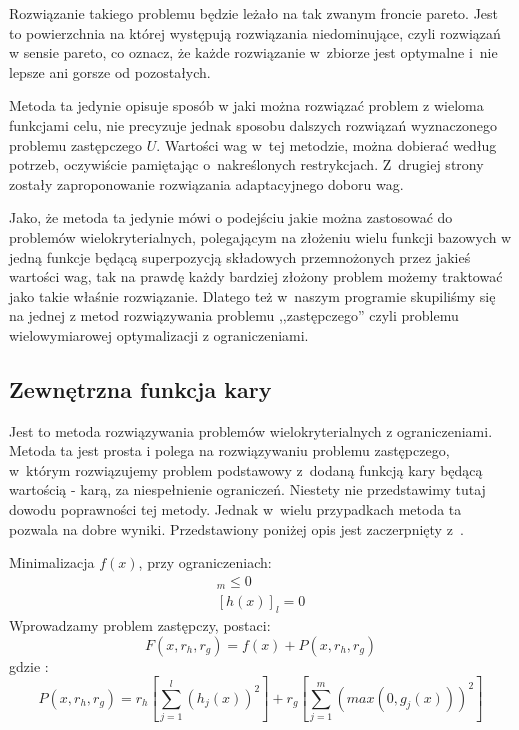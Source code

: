 \documentclass{classrep}
\begin{document}
Rozwiązanie takiego problemu będzie leżało na tak zwanym froncie pareto. Jest to powierzchnia na której występują rozwiązania niedominujące, czyli rozwiązań w sensie pareto, co oznacz, że każde rozwiązanie w~zbiorze jest optymalne i~nie lepsze ani gorsze od pozostałych.
 
Metoda ta jedynie opisuje sposób w jaki można rozwiązać problem z wieloma funkcjami celu, nie precyzuje jednak sposobu dalszych rozwiązań   wyznaczonego problemu zastępczego $U$. Wartości wag w~tej metodzie, można dobierać według potrzeb, oczywiście pamiętając o~nakreślonych restrykcjach. Z~drugiej strony zostały zaproponowanie rozwiązania adaptacyjnego doboru wag.

Jako, że metoda ta jedynie mówi o podejściu jakie można zastosować do problemów wielokryterialnych, polegającym na złożeniu wielu funkcji bazowych w jedną funkcje będącą superpozycją składowych przemnożonych przez jakieś wartości wag, tak na prawdę każdy bardziej złożony problem możemy traktować jako takie właśnie rozwiązanie. Dlatego też w~naszym programie skupiliśmy się na jednej z metod rozwiązywania problemu ,,zastępczego'' czyli problemu wielowymiarowej optymalizacji z ograniczeniami.

\subsection{Zewnętrzna funkcja kary}
Jest to metoda rozwiązywania problemów wielokryterialnych z ograniczeniami. Metoda ta jest prosta i polega na rozwiązywaniu problemu zastępczego, w~którym rozwiązujemy problem podstawowy z~dodaną funkcją kary będącą wartością - karą, za niespełnienie ograniczeń. Niestety nie przedstawimy tutaj dowodu poprawności tej metody. Jednak w~wielu przypadkach metoda ta pozwala na dobre wyniki. Przedstawiony poniżej opis jest zaczerpnięty z~\cite{3}.

\noindent Minimalizacja $f(x)$, przy ograniczeniach:
\begin{align}
[g(x)]_m\leq0 \nonumber\\
 [h(x)]_l=0 \nonumber
\end{align}
\noindent Wprowadzamy problem zastępczy, postaci: 
\begin{equation}
F(x,r_h, r_g) = f(x) + P(x,r_h, r_g)
\end{equation}
\noindent  gdzie : 
\begin{equation}
P(x,r_h, r_g)=r_h \left[ \sum \limits ^{l} _{j=1} (h_j(x))^{2} \right]  + r_g \left[ \sum \limits ^{m} _{j=1}
 \left( max \left( 0, g_j (x) \right) \right) ^{2} \right]
\end{equation}
\end{document}
